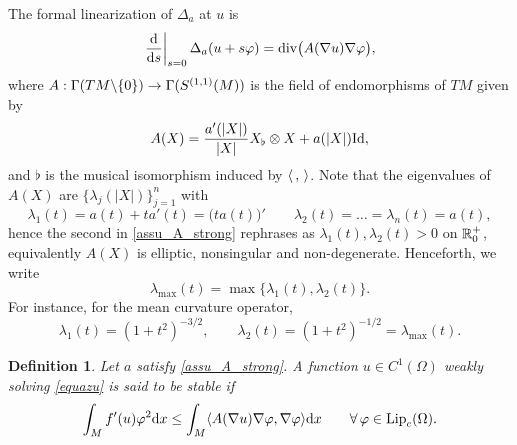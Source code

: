 \documentclass[10 pt,a4paper]{article}
\newtheorem{definition}{Definition}
\theoremstyle{definition}
\newtheorem{remark}[definition]{Remark}
\begin{document}
 
The formal linearization of $\Delta_a$ at $u$ is
\begin{equation}\label{def_linearized}
\left.\frac{\mathrm{d}}{\mathrm{d} s} \right|_{s=0} \Delta_a(u+s\varphi) =  \mathrm{div}\big(A(\nabla u) \nabla \varphi\big),
\end{equation}
where $A : \Gamma(TM\backslash \{0\}) \rightarrow \Gamma(S^{(1,1)}(M))$ is the field of endomorphisms of $TM$ given by 
\begin{equation}\label{def_A}
	A(X) = \frac{a'(|X|)}{|X|} X_\flat \otimes X + a(|X|) {\rm Id},
\end{equation}
and $\flat$ is the musical isomorphism induced by $\langle \, , \, \rangle$. Note that the eigenvalues of $A(X)$ are $\{\lambda_j(|X|)\}_{j=1}^n$ with
\begin{equation}\label{eigenvalues}
	\lambda_1(t) = a(t) + ta'(t) = \big(t a(t)\big)' \qquad \lambda_2(t) = \ldots = \lambda_n(t) = a(t),
\end{equation}
hence the second in \eqref{assu_A_strong} rephrases as $\lambda_1(t),\lambda_2(t) > 0$ on $\mathbb R^+_0$, equivalently $A(X)$ is elliptic, nonsingular and non-degenerate. Henceforth, we write
\[
\lambda_{\max}(t) = \max \big\{ \lambda_1(t), \lambda_2(t) \big\}.
\]
For instance, for the mean curvature operator, 
\[
\lambda_1(t) = (1+t^2)^{-3/2}, \qquad \lambda_2(t) = (1+t^2)^{-1/2} = \lambda_{\max}(t).
\]
%

\begin{definition}
	Let $a$ satisfy \eqref{assu_A_strong}. A function $u \in C^1(\Omega)$ weakly solving \eqref{equazu} is said to be \emph{stable} if
	\begin{equation}\label{hardy}
		\int_{M} f'(u) \varphi^2\mathrm{d} x \le \int_M \langle A(\nabla u)\nabla\varphi, \nabla \varphi\rangle \mathrm{d} x \qquad \forall \, \varphi \in \mathrm{Lip}_c(\Omega).
	\end{equation}
\end{definition}
%

\end{document}
